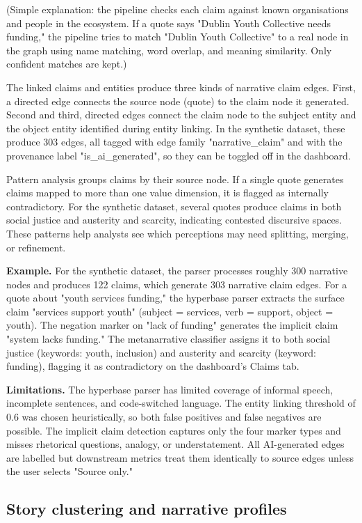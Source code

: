 \documentclass[11pt,a4paper]{article}
\begin{document}
(Simple explanation: the pipeline checks each claim against known
organisations and people in the ecosystem. If a quote says "Dublin Youth
Collective needs funding," the pipeline tries to match "Dublin Youth
Collective" to a real node in the graph using name matching, word
overlap, and meaning similarity. Only confident matches are kept.)

The linked claims and entities produce three kinds of narrative claim
edges. First, a directed edge connects the source node (quote) to the
claim node it generated. Second and third, directed edges connect the
claim node to the subject entity and the object entity identified during
entity linking. In the synthetic dataset, these produce 303 edges, all
tagged with edge family "narrative\_claim" and with the provenance label
"is\_ai\_generated", so they can be toggled off in the dashboard.

Pattern analysis groups claims by their source node. If a single quote
generates claims mapped to more than one value dimension, it is flagged
as internally contradictory. For the synthetic dataset, several quotes
produce claims in both social justice and austerity and scarcity,
indicating contested discursive spaces. These patterns help analysts see
which perceptions may need splitting, merging, or refinement.

\textbf{Example.} For the synthetic dataset, the parser processes roughly 300
narrative nodes and produces 122 claims, which generate 303 narrative
claim edges. For a quote about "youth services funding," the hyperbase
parser extracts the surface claim "services support youth" (subject =
services, verb = support, object = youth). The negation marker on "lack
of funding" generates the implicit claim "system lacks funding." The
metanarrative classifier assigns it to both social justice (keywords:
youth, inclusion) and austerity and scarcity (keyword: funding), flagging
it as contradictory on the dashboard's Claims tab.

\textbf{Limitations.} The hyperbase parser has limited coverage of informal
speech, incomplete sentences, and code-switched language. The entity
linking threshold of 0.6 was chosen heuristically, so both false
positives and false negatives are possible. The implicit claim detection
captures only the four marker types and misses rhetorical questions,
analogy, or understatement. All AI-generated edges are labelled but
downstream metrics treat them identically to source edges unless the
user selects "Source only."

\subsection{Story clustering and narrative profiles}
\end{document}
